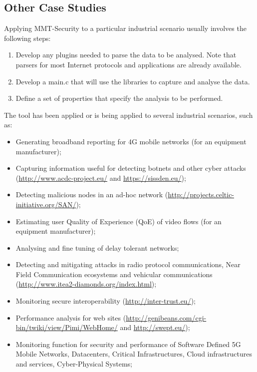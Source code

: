 


\subsection{Other Case Studies}
\label{Other}


Applying MMT-Security to a particular industrial scenario usually involves the following steps: 
\begin{enumerate}
\item
Develop any plugins needed to parse the data to be analysed. Note that parsers for most Internet protocols and applications are already available.
\item
Develop a {\textquotedbl}main.c{\textquotedbl} that will use the libraries to capture and analyse the data.
\item
Define a set of properties that specify the analysis to be performed. 
\end{enumerate}

The tool has been applied or is being applied to several industrial scenarios, such as:
\begin{itemize}
\item Generating broadband reporting for 4G mobile networks (for an equipment manufacturer);
\item Capturing information useful for detecting botnets and other cyber attacks (\url{http://www.acdc-project.eu/} and \url{https://sissden.eu/});
\item Detecting malicious nodes in an ad-hoc network (\url{http://projects.celtic-initiative.org/SAN/});
\item Estimating user Quality of Experience (QoE) of video flows (for an equipment manufacturer);
\item Analysing and fine tuning of delay tolerant networks;
\item Detecting and mitigating attacks in radio protocol communications, Near Field Communication ecosystems and vehicular communications (\url{http://www.itea2-diamonds.org/index.html});
\item Monitoring secure interoperability (\url{http://inter-trust.eu/});
\item Performance analysis for web sites (\url{http://genibeans.com/cgi-bin/twiki/view/Pimi/WebHome/} and \url{http://swept.eu/});
\item Monitoring function for security and performance of Software Defined 5G Mobile Networks, Datacenters, Critical Infrastructures, Cloud infrastructures and services, Cyber-Physical Systems;
\end{itemize}

